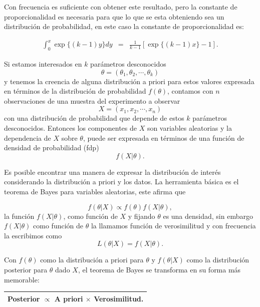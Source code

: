 \noindent Con frecuencia es suficiente con obtener este resultado, pero la constante de proporcionalidad es necesaria para que lo que se esta obteniendo sea un distribuci\'on de probabilidad, en este caso la constante de proporcionalidad es:

\begin{eqnarray*}
\int_{0}^{x}  \exp\{(k-1)y\}dy &=& \frac{1}{k-1}\left[\exp\{(k-1)x\}-1\right].
\end{eqnarray*}
\newpage

\noindent Si estamos interesados en $k$ par\'ametros desconocidos $$\theta=(\theta_1,\theta_2,\cdots,\theta_k)$$ y tenemos la creencia de alguna distribuci\'on a priori para estos valores expresada en t\'erminos de la distribuci\'on de probabilidad $f(\theta)$, contamos con $n$ observaciones de una muestra del experimento a observar $$X=(x_1,x_2,\cdots,x_n)$$
con una distribuci\'on de probabilidad que depende de estos $k$ par\'ametros desconocidos. Entonces los componentes de $X$ son variables aleatorias y la dependencia de $X$ sobre $\theta$,  puede ser expresada en t\'erminos de una funci\'on de densidad de probabilidad (fdp) $$f(X|\theta).$$

\noindent Es posible encontrar una manera de expresar la distribuci\'on de inter\'es considerando la distribuci\'on a priori y los datos. La herramienta b\'asica es el teorema de Bayes para variables aleatorias, este afirma que

$$f(\theta|X)\propto f(\theta)f(X|\theta),$$
la funci\'on $f(X|\theta)$, como funci\'on de $X$ y fijando $\theta$ es una densidad, sin embargo $f(X|\theta)$ como funci\'on de $\theta$ la llamamos funci\'on de verosimilitud y con frecuencia la escribimos como $$L(\theta|X)=f(X|\theta).$$

\noindent Con $f(\theta)$ como la distribuci\'on a priori para $\theta$ y $f(\theta|X)$ como la distribuci\'on posterior para $\theta$ dado $X$, el teorema de Bayes se transforma en su forma m\'as memorable:
 
\begin{center}
\begin{tabular}{|c|}
\hline
Posterior $\propto$ A priori $\times$ Verosimilitud.\\
\hline
\end{tabular}
\end{center}


